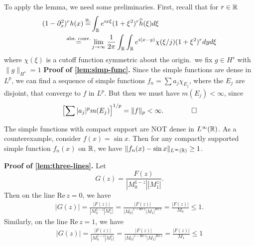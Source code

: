 %
%
%
To apply the lemma, we need some preliminaries. First, recall that for $r \in
\mathbb{R}$
%
%
\begin{equation*}
\begin{split}
(1 - \partial_x^{2})^{r}h(x) 
\overset{\text{it.}}{=} & \int_{\mathbb{R}} e^{ix
\xi}(1 + \xi^{2})^{r} \widehat{h}(\xi) d \xi
\\
\overset{\text{abs.\ conv.}}{=}  & \lim_{j \to \infty} \frac{1}{2 \pi} \int_{\mathbb{R}}
\int_{\mathbb{R}} e^{i(x-y)}
\chi( \xi/j) (1 + \xi^{2})^{r}dy d \xi
\end{split}
\end{equation*}
%
%
where $\chi(\xi)$ is a cutoff function symmetric about the origin.\ 
we fix $g \in H^{s}$ with $\| g\|_{H^{s}} = 1$
%
%
%
%
%
{\bf Proof of \autoref{lem:simp-func}.}
Since the simple functions are dense in $L^p$, we can find a sequence of simple
functions $f_n=\sum a_{j} \chi_{E_j}$, where the $E_j$ are disjoint, that
converge to $f$ in $L^p$. But then we must have $m(E_j) < \infty$, since
%
%
\begin{equation*}
\begin{split}
	\left[ \sum | a_j |^{p} m(E_j) \right]^{1/p} =  \|f\|_{p} < \infty. \qquad
	\qed
\end{split}
\end{equation*}
%
%
%
%
\begin{framed}
\begin{remark}
	\label{rem:density}
	The simple functions with compact support are NOT dense in $L^\infty(\mathbb{R})$. As a
	counterexample, consider $f(x) = \sin x$. Then for any compactly supported simple
	function $f_n(x)$ on $\mathbb{R}$, we have $\| f_n(x) - \sin x \|_{L^\infty(\mathbb{R})} \ge 1$.
\end{remark}
\end{framed}
%
%
{\bf Proof of \autoref{lem:three-lines}.} Let $$G(z) = \frac{F(z)}{| M_0^{1-z} | |M_1^z |}.$$ Then on the
line $\text{Re}\, z =0$, we have
%
%
\begin{equation*}
\begin{split}
	| G(z) | = \frac{| F(z) |}{| M_0^{1-z} | M_1^z |} = \frac{| F(z) |}{|
	M_0|^{1-\text{Re}\, z}  |M_1|^{\text{Re}\, z}} = \frac{| F(z) |}{M_0} \le 1.
\end{split}
\end{equation*}
%
%
Similarly, on the line $\text{Re}\, z=1$, we have
\begin{equation*}
\begin{split}
	| G(z) | = \frac{| F(z) |}{| M_0^{1-z} | M_1^z |} = \frac{| F(z) |}{|
	M_0|^{1-\text{Re}\, z}  |M_1|^{\text{Re}\, z}} = \frac{| F(z) |}{M_1} \le 1
\end{split}
\end{equation*}
